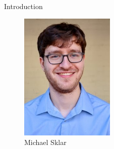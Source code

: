\begin{frame}{Introduction}
\begin{figure}
    \centering
     \includegraphics[width=0.4\textwidth]{figures/michael-sklar.jpeg}
     \caption{Michael Sklar}
\end{figure}
\end{frame}
